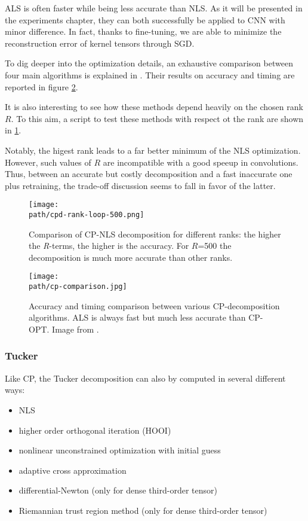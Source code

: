 ALS is often faster while being less accurate than NLS. As it will be presented in the experiments chapter, they can both successfully be applied to CNN with minor difference. In fact, thanks to fine-tuning, we are able to minimize the reconstruction error of kernel tensors through SGD. 

To dig deeper into the optimization details, an exhaustive comparison between four main algorithms is explained in \parencite{WCPD-talk}. Their results on accuracy and timing are reported in figure \ref{fig:cp-comparison}.
\newline 

It is also interesting to see how these methods depend heavily on the chosen rank $R$. To this aim, a script to test these methods with respect ot the rank are shown in \ref{fig:rank-loop}. 

Notably, the higest rank leads to a far better minimum of the NLS optimization. However, such values of $R$ are incompatible with a good speeup in convolutions. Thus, between an accurate but costly decomposition and a fast inaccurate one plus retraining, the trade-off discussion seems to fall in favor of the latter.

\begin{figure}[h!]
 \centering
 \texttt{[image: \\path/cpd-rank-loop-500.png]} 
 \caption{Comparison of CP-NLS decomposition for different ranks: the higher the \emph{R}-terms, the higher is the accuracy. For $R$=500 the decomposition is much more accurate than other ranks.}
 \label{fig:rank-loop}
\end{figure}

\begin{figure}[h!]
 \centering
 \texttt{[image: \\path/cp-comparison.jpg]} 
 \caption{Accuracy and timing comparison between various CP-decomposition algorithms. ALS is always fast but much less accurate than CP-OPT. Image from \parencite{WCPD-talk}.}
 \label{fig:cp-comparison}
\end{figure}

\newpage
\subsubsection{Tucker}
Like CP, the Tucker decomposition can also by computed in several different ways: 
\begin{itemize}
    \item NLS
    
    \item higher order orthogonal iteration (HOOI)

    \item nonlinear unconstrained optimization with initial guess
    
    \item adaptive cross approximation 
        
    \item differential-Newton (only for dense third-order tensor) 
    
    \item Riemannian trust region method (only for dense third-order tensor) 
\end{itemize}


